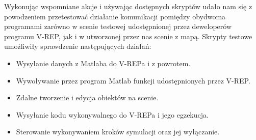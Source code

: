 \documentclass[11pt, a4paper, twoside]{article}
\begin{document}
Wykonując wspomniane akcje i używając dostępnych skryptów udało nam się z powodzeniem przetestować działanie komunikacji pomiędzy obydwoma programami zarówno w scenie testowej udostępnionej przez deweloperów programu V-REP, jak i w utworzonej przez nas scenie z mapą. Skrypty testowe umożliwiły sprawdzenie następujących działań:
\begin{itemize}
	\item Wysyłanie danych z Matlaba do V-REPa i z powrotem.
	\item Wywoływanie przez program Matlab funkcji udostępnionych przez V-REP.
	\item Zdalne tworzenie i edycja obiektów na scenie.
	\item Wysyłanie kodu wykonywalnego do V-REPa i jego egzekucja.
	\item Sterowanie wykonywaniem kroków symulacji oraz jej wyłączanie.
\end{itemize}
\end{document}
